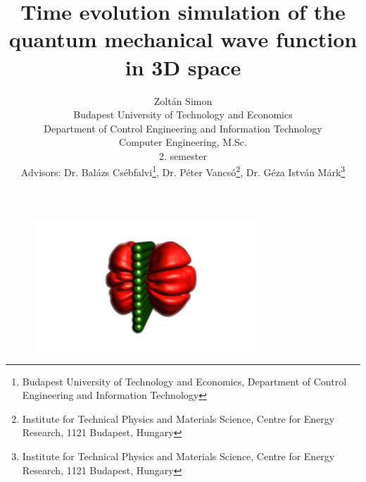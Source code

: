 \documentclass[11pt]{article}
\title{Time evolution simulation of the quantum mechanical wave function in 3D space}
\author{Zoltán Simon\\
	[1cm]{Budapest University of Technology and Economics\\
		\small Department of Control Engineering and Information Technology\\
		\small Computer Engineering, M.Sc.\\
		\small 2. semester}\\
	[1cm]{\small Advisors: Dr. Balázs Csébfalvi\footnote{Budapest University of Technology and Economics, Department of Control Engineering and Information Technology},
		Dr. Péter Vancsó\footnote{Institute for Technical Physics and Materials Science, Centre for Energy Research, 1121 Budapest, Hungary},
		Dr. Géza István Márk\footnote{Institute for Technical Physics and Materials Science, Centre for Energy Research, 1121 Budapest, Hungary}}}
\begin{document}
	
	\maketitle
	
	\begin{figure}[H]
		\centering
		\includegraphics[width=0.75\textwidth]{figures/title_image.png}
	\end{figure}
	\thispagestyle{empty}
	\pagebreak
	
	\tableofcontents
	
	\pagebreak

	

	\pagebreak
	
	
	
	
	
	

	

	

		

		

	\printglossaries

	
	
\end{document}
